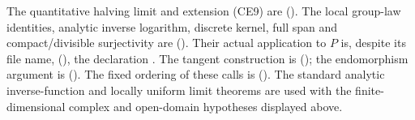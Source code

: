 The quantitative halving limit and extension (CE9) are
().
The local group-law identities, analytic inverse logarithm, discrete
kernel, full span and compact/divisible surjectivity are
().
Their actual application to \(P\) is, despite its file name,
(),
the declaration .
The tangent construction is
();
the endomorphism argument is
().
The fixed ordering of these calls is
().
The standard analytic inverse-function and locally uniform limit
theorems are used with the finite-dimensional complex and open-domain
hypotheses displayed above.
